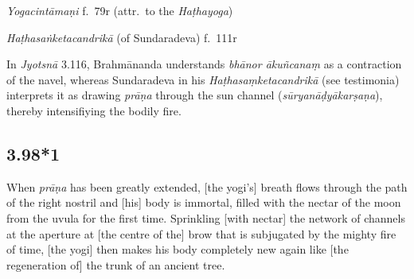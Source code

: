 \begin{ekdosis}
\begin{testimonia}[hp03_098]
\emph{Yogacintāmaṇi} f.~79r (attr.~to the \emph{Haṭhayoga})
\begin{versinnote}
\end{versinnote}

\emph{Haṭhasaṅketacandrikā} (of Sundaradeva) f.~111r
\begin{versinnote}
\end{versinnote}
\end{testimonia}

\begin{philcomm}[hp03_098]
In \emph{Jyotsnā} 3.116, Brahmānanda understands \emph{bhānor ākuñcanaṃ} as a contraction of the navel, whereas Sundaradeva in his \emph{Haṭhasaṃketacandrikā} (see testimonia) interprets it as drawing \emph{prāṇa} through the sun channel (\emph{sūryanāḍyākarṣaṇa}), thereby intensifiying the bodily fire.
\end{philcomm}


\subsection*{3.98*1}
\begin{translation}[hp03_098_1]
When \emph{prāṇa} has been greatly extended, [the yogi's] breath flows through the path of the right nostril and [his] body is immortal, filled with the nectar of the moon from the uvula for the first time. Sprinkling [with nectar] the network of channels at the aperture at [the centre of the] brow that is subjugated by the mighty fire of time, [the yogi] then makes his body completely new again like [the regeneration of] the trunk of an ancient tree.
\end{translation}

\begin{sources}[hp03_098_1]
\end{sources}%


\end{ekdosis}
